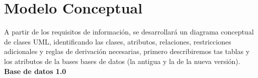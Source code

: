 


\section{Modelo Conceptual}

A partir de los requisitos de información, se desarrollará un diagrama conceptual de clases UML, identificando las clases, atributos, relaciones, restricciones adicionales y reglas de derivación necesarias, primero describiremos tas tablas y los atributos de la bases bases de datos (la antigua y la de la nueva versión).\\

\textbf{Base de datos 1.0}\\

